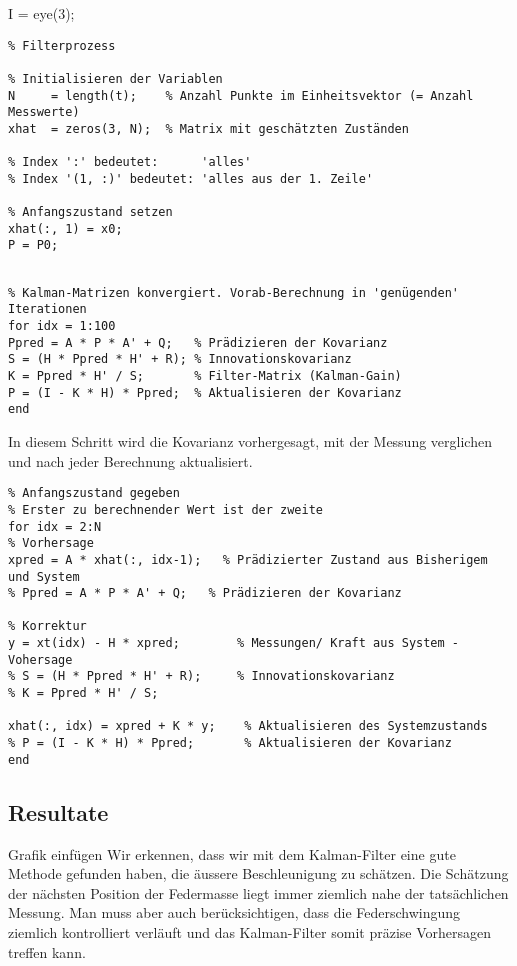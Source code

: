 I = eye(3);          %

\begin{lstlisting}
% Filterprozess

% Initialisieren der Variablen
N     = length(t);    % Anzahl Punkte im Einheitsvektor (= Anzahl Messwerte)
xhat  = zeros(3, N);  % Matrix mit geschätzten Zuständen

% Index ':' bedeutet:      'alles'
% Index '(1, :)' bedeutet: 'alles aus der 1. Zeile'

% Anfangszustand setzen
xhat(:, 1) = x0; 
P = P0;
\end{lstlisting}

\begin{lstlisting}
	
% Kalman-Matrizen konvergiert. Vorab-Berechnung in 'genügenden' Iterationen
for idx = 1:100
Ppred = A * P * A' + Q;   % Prädizieren der Kovarianz
S = (H * Ppred * H' + R); % Innovationskovarianz
K = Ppred * H' / S;       % Filter-Matrix (Kalman-Gain)
P = (I - K * H) * Ppred;  % Aktualisieren der Kovarianz  
end
\end{lstlisting}

In diesem Schritt wird die Kovarianz vorhergesagt, mit der Messung verglichen und nach jeder Berechnung aktualisiert.

\begin{lstlisting}
% Anfangszustand gegeben
% Erster zu berechnender Wert ist der zweite
for idx = 2:N
% Vorhersage
xpred = A * xhat(:, idx-1);   % Prädizierter Zustand aus Bisherigem und System
% Ppred = A * P * A' + Q;   % Prädizieren der Kovarianz

% Korrektur
y = xt(idx) - H * xpred;        % Messungen/ Kraft aus System - Vohersage
% S = (H * Ppred * H' + R);     % Innovationskovarianz
% K = Ppred * H' / S;           

xhat(:, idx) = xpred + K * y;    % Aktualisieren des Systemzustands
% P = (I - K * H) * Ppred;       % Aktualisieren der Kovarianz
end
\end{lstlisting}

\subsection{Resultate}
Grafik einfügen
Wir erkennen, dass wir mit dem Kalman-Filter eine gute Methode gefunden haben, die äussere Beschleunigung zu schätzen. Die Schätzung der nächsten Position der Federmasse liegt immer ziemlich nahe der tatsächlichen Messung. Man muss aber auch berücksichtigen, dass die Federschwingung ziemlich kontrolliert verläuft und das Kalman-Filter somit präzise Vorhersagen treffen kann.
